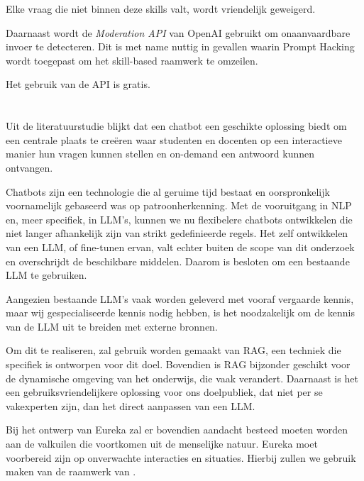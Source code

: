 Elke vraag die niet binnen deze skills valt, wordt vriendelijk geweigerd.

Daarnaast wordt de \textit{Moderation API} van OpenAI gebruikt om onaanvaardbare invoer te detecteren. Dit is met name nuttig in gevallen waarin Prompt Hacking wordt toegepast om het skill-based raamwerk te omzeilen.

Het gebruik van de API is gratis.

\section{}%
\label{sec:besluit}

Uit de literatuurstudie blijkt dat een chatbot een geschikte oplossing biedt om een centrale plaats te creëren waar studenten en docenten op een interactieve manier hun vragen kunnen stellen en on-demand een antwoord kunnen ontvangen.

Chatbots zijn een technologie die al geruime tijd bestaat en oorspronkelijk voornamelijk gebaseerd was op patroonherkenning. Met de vooruitgang in \acrshort{NLP} en, meer specifiek, in \acrshort{LLM}'s, kunnen we nu flexibelere chatbots ontwikkelen die niet langer afhankelijk zijn van strikt gedefinieerde regels. Het zelf ontwikkelen van een \acrshort{LLM}, of fine-tunen ervan, valt echter buiten de scope van dit onderzoek en overschrijdt de beschikbare middelen. Daarom is besloten om een bestaande \acrshort{LLM} te gebruiken.

Aangezien bestaande \acrshort{LLM}'s vaak worden geleverd met vooraf vergaarde kennis, maar wij gespecialiseerde kennis nodig hebben, is het noodzakelijk om de kennis van de \acrshort{LLM} uit te breiden met externe bronnen.

Om dit te realiseren, zal gebruik worden gemaakt van RAG, een techniek die specifiek is ontworpen voor dit doel. Bovendien is RAG bijzonder geschikt voor de dynamische omgeving van het onderwijs, die vaak verandert. Daarnaast is het een gebruiksvriendelijkere oplossing voor ons doelpubliek, dat niet per se vakexperten zijn, dan het direct aanpassen van een \acrshort{LLM}.

Bij het ontwerp van Eureka zal er bovendien aandacht besteed moeten worden aan de valkuilen die voortkomen uit de menselijke natuur. Eureka moet voorbereid zijn op onverwachte interacties en situaties. Hierbij zullen we gebruik maken van de raamwerk van \textcite{Taneja2024}.


